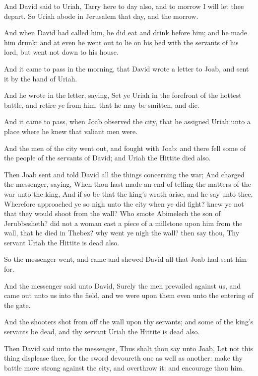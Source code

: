 \verse And David said to Uriah, Tarry here to day also, and to morrow I will let thee depart. So Uriah abode in Jerusalem that day, and the morrow.

\verse And when David had called him, he did eat and drink before him; and he made him drunk: and at even he went out to lie on his bed with the servants of his lord, but went not down to his house.

\verse And it came to pass in the morning, that David wrote a letter to Joab, and sent it by the hand of Uriah.

\verse And he wrote in the letter, saying, Set ye Uriah in the forefront of the hottest battle, and retire ye from him, that he may be smitten, and die.

\verse And it came to pass, when Joab observed the city, that he assigned Uriah unto a place where he knew that valiant men were.

\verse And the men of the city went out, and fought with Joab: and there fell some of the people of the servants of David; and Uriah the Hittite died also.

\verse Then Joab sent and told David all the things concerning the war; \verse And charged the messenger, saying, When thou hast made an end of telling the matters of the war unto the king, \verse And if so be that the king's wrath arise, and he say unto thee, Wherefore approached ye so nigh unto the city when ye did fight? knew ye not that they would shoot from the wall?  \verse Who smote Abimelech the son of Jerubbesheth? did not a woman cast a piece of a millstone upon him from the wall, that he died in Thebez? why went ye nigh the wall? then say thou, Thy servant Uriah the Hittite is dead also.

\verse So the messenger went, and came and shewed David all that Joab had sent him for.

\verse And the messenger said unto David, Surely the men prevailed against us, and came out unto us into the field, and we were upon them even unto the entering of the gate.

\verse And the shooters shot from off the wall upon thy servants; and some of the king's servants be dead, and thy servant Uriah the Hittite is dead also.

\verse Then David said unto the messenger, Thus shalt thou say unto Joab, Let not this thing displease thee, for the sword devoureth one as well as another: make thy battle more strong against the city, and overthrow it: and encourage thou him.

